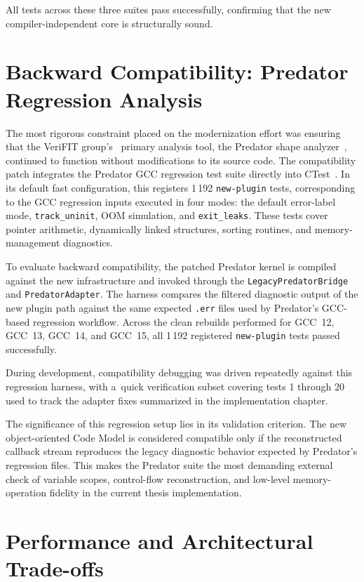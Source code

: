 \documentclass[xpsejal00-gcc-plugin.tex]{subfiles}
\begin{document}
All tests across these three suites pass successfully, confirming that the new compiler-independent core is structurally sound.

\section{Backward Compatibility: Predator Regression Analysis}\label{sec:predator-regression}

The most rigorous constraint placed on the modernization effort was ensuring that the VeriFIT group's~\cite{VeriFIT} primary analysis tool, the Predator shape analyzer~\cite{PredatorSuite2016}, continued to function without modifications to its source code.
The compatibility patch integrates the Predator GCC regression test suite directly into CTest~\cite{CMake}.
In its default fast configuration, this registers 1\,192 \texttt{new-plugin} tests, corresponding to the GCC regression inputs executed in four modes: the default error-label mode, \texttt{track\_uninit}, OOM simulation, and \texttt{exit\_leaks}.
These tests cover pointer arithmetic, dynamically linked structures, sorting routines, and memory-management diagnostics.

To evaluate backward compatibility, the patched Predator kernel is compiled against the new infrastructure and invoked through the \texttt{LegacyPredatorBridge} and \texttt{PredatorAdapter}.
The harness compares the filtered diagnostic output of the new plugin path against the same expected \texttt{.err} files used by Predator's GCC-based regression workflow.
Across the clean rebuilds performed for GCC~12, GCC~13, GCC~14, and GCC~15, all 1\,192 registered \texttt{new-plugin} tests passed successfully.

During development, compatibility debugging was driven repeatedly against this regression harness, with a~quick verification subset covering tests 1 through 20 used to track the adapter fixes summarized in the implementation chapter.

The significance of this regression setup lies in its validation criterion.
The new object-oriented Code Model is considered compatible only if the reconstructed callback stream reproduces the legacy diagnostic behavior expected by Predator's regression files.
This makes the Predator suite the most demanding external check of variable scopes, control-flow reconstruction, and low-level memory-operation fidelity in the current thesis implementation.

\section{Performance and Architectural Trade-offs}\label{sec:performance}
\end{document}

